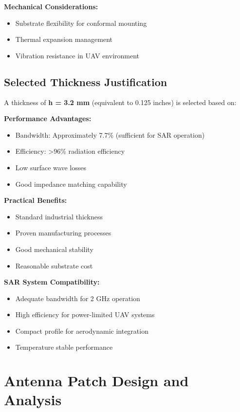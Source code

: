 \documentclass[12pt]{article}
\begin{document}
\textbf{Mechanical Considerations:}
\begin{itemize}
    \item Substrate flexibility for conformal mounting
    \item Thermal expansion management
    \item Vibration resistance in UAV environment
\end{itemize}

\subsection{Selected Thickness Justification}

A thickness of \textbf{h = 3.2 mm} (equivalent to 0.125 inches) is selected based on:

\textbf{Performance Advantages:}
\begin{itemize}
    \item Bandwidth: Approximately 7.7\% (sufficient for SAR operation)
    \item Efficiency: >96\% radiation efficiency
    \item Low surface wave losses
    \item Good impedance matching capability
\end{itemize}

\textbf{Practical Benefits:}
\begin{itemize}
    \item Standard industrial thickness
    \item Proven manufacturing processes
    \item Good mechanical stability
    \item Reasonable substrate cost
\end{itemize}

\textbf{SAR System Compatibility:}
\begin{itemize}
    \item Adequate bandwidth for 2 GHz operation
    \item High efficiency for power-limited UAV systems
    \item Compact profile for aerodynamic integration
    \item Temperature stable performance
\end{itemize}

\section{Antenna Patch Design and Analysis}
\end{document}
